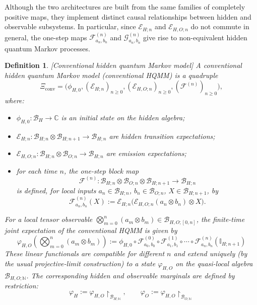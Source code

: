 \documentclass[11pt, reco]{article}
\newtheorem{definition}[theorem]{Definition}
\begin{document}
Although the two architectures are built from the same families of completely positive maps, they implement distinct causal relationships between hidden and observable subsystems. In particular, since \(\mathcal{E}_{H;n}\) and \(\mathcal{E}_{H,O;n}\)  do not commute in general, the one-step maps \(\mathcal{F}_{a_n,b_n}^{(n)}\) and \(\mathcal{G}_{a_n,b_n}^{(n)}\) give rise to non-equivalent hidden quantum Markov processes.

\begin{definition}\cite{AGLS24Q}[Conventional hidden quantum Markov model]
A \emph{conventional hidden quantum Markov model} (conventional HQMM) is a quadruple
\[
\Xi_{\mathrm{conv}}
=
\bigl(\phi_{H,0},(\mathcal{E}_{H;n})_{n\ge 0},(\mathcal{E}_{H,O;n})_{n\ge 0},(\mathcal{F}^{(n)})_{n\ge 0}\bigr),
\]
where:
\begin{itemize}
\item \(\phi_{H,0}:\mathcal{B}_H\to\mathbb{C}\) is an initial state on the hidden algebra;
\item \(\mathcal{E}_{H;n}:\mathcal{B}_{H;n}\otimes\mathcal{B}_{H;n+1}\to\mathcal{B}_{H;n}\) are hidden transition expectations;
\item \(\mathcal{E}_{H,O;n}:\mathcal{B}_{H;n}\otimes\mathcal{B}_{O;n}\to\mathcal{B}_{H;n}\) are emission expectations;
\item for each time \(n\), the one-step block map
\[
\mathcal{F}^{(n)}:\mathcal{B}_{H;n}\otimes\mathcal{B}_{O;n}\otimes\mathcal{B}_{H;n+1}\to\mathcal{B}_{H;n}
\]
is defined, for local inputs \(a_n\in\mathcal{B}_{H;n}\), \(b_n\in\mathcal{B}_{O;n}\), \(X\in\mathcal{B}_{H;n+1}\), by
\[
\mathcal{F}^{(n)}_{a_n,b_n}(X)
:=
\mathcal{E}_{H;n}\bigl(\mathcal{E}_{H,O;n}(a_n\otimes b_n)\otimes X\bigr).
\]
\end{itemize}
For a local tensor observable \(\bigotimes_{m=0}^n (a_m\otimes b_m)\in\mathcal{B}_{H,O;[0,n]}\), the finite-time joint expectation of the conventional HQMM is given by
\begin{equation}\label{eq:conv-state-no-sup}
\varphi_{H,O}\!\left(\bigotimes_{m=0}^n (a_m\otimes b_m)\right)
:=
\phi_{H,0}\circ
\mathcal{F}^{(0)}_{a_0,b_0}\circ\mathcal{F}^{(1)}_{a_1,b_1}\circ\cdots\circ
\mathcal{F}^{(n)}_{a_n,b_n}(\mathbb{I}_{H;n+1})
\end{equation}
These linear functionals are compatible for different \(n\) and extend uniquely (by the usual projective-limit construction) to a state \(\varphi_{H,O}\) on the quasi-local algebra \(\mathcal{B}_{H,O;\mathbb{N}}\). The corresponding hidden and observable marginals are defined by restriction:
\[
\varphi_H
:=
\varphi_{H,O}\!\restriction_{\mathcal{B}_{H;\mathbb{N}}},\qquad
\varphi_O
:=
\varphi_{H,O}\!\restriction_{\mathcal{B}_{O;\mathbb{N}}}
\]
\end{definition}
\end{document}
